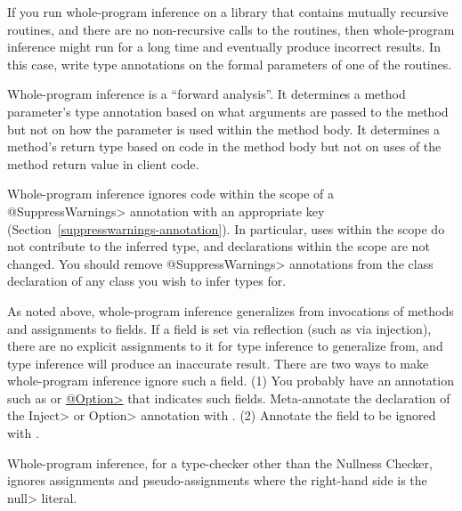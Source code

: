 If you run whole-program inference on a library that contains mutually
recursive routines, and there are no non-recursive calls to the routines,
then whole-program inference might run for a long time and eventually produce
incorrect results.  In this case, write type annotations on the formal
parameters of one of the routines.

Whole-program inference is a ``forward analysis''.
It determines a method parameter's type
annotation based on what arguments are passed to the method but not on how the
parameter is used within the method body.
It determines a method's return type based on code in the method body but
not on uses of the method return value in client code.



Whole-program inference ignores code within the scope of a
\<@SuppressWarnings> annotation with an appropriate key
(Section~\ref{suppresswarnings-annotation}).  In particular, uses within
the scope do not contribute to the inferred type, and declarations within
the scope are not changed.  You should remove \<@SuppressWarnings> annotations
from the class declaration of any class you wish to infer types for.

As noted above, whole-program inference generalizes from invocations of methods and
assignments to fields.  If a field is set via
reflection (such as via injection), there are no explicit assignments to it
for type inference to generalize from, and type inference will produce
an inaccurate result.  There are two ways to make whole-program inference
ignore such a field.
%
(1)
You probably have an annotation such as
or
\href{https://plumelib.org/options/api/org/plumelib/options/Option.html}{\<@Option>}
that indicates such fields.  Meta-annotate the declaration of the \<Inject>
or \<Option> annotation with
.
%
(2)
Annotate the field to be ignored with
.

Whole-program inference, for a type-checker other than the Nullness Checker,
ignores assignments and pseudo-assignments where the right-hand side is the \<null> literal.



